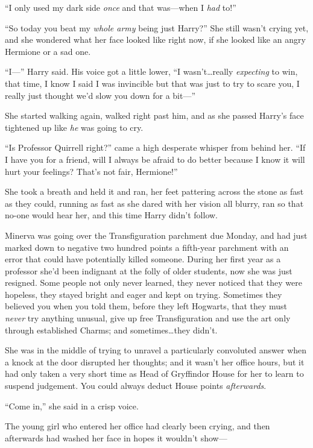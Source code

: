 “I only used my dark side \emph{once} and that was—when I \emph{had} to!”

“So today you beat my \emph{whole army} being just Harry?” She still wasn’t crying yet, and she wondered what her face looked like right now, if she looked like an angry Hermione or a sad one.

“I—” Harry said. His voice got a little lower,
“I wasn’t…really \emph{expecting} to win, that time, I know I said I was invincible but that was just to try to scare you, I really just thought we’d slow you down for a bit—”

She started walking again, walked right past him, and as she passed Harry’s face tightened up like \emph{he} was going to cry.

“Is Professor Quirrell right?” came a high desperate whisper from behind her.
“If I have you for a friend, will I always be afraid to do better because I know it will hurt your feelings? That’s not fair, Hermione!”

She took a breath and held it and ran, her feet pattering across the stone as fast as they could, running as fast as she dared with her vision all blurry, ran so that no-one would hear her, and this time Harry didn’t follow.

\later

Minerva was going over the Transfiguration parchment due Monday, and had just marked down to negative two hundred points a fifth-year parchment with an error that could have potentially killed someone. During her first year as a professor she’d been indignant at the folly of older students, now she was just resigned. Some people not only never learned, they never noticed that they were hopeless, they stayed bright and eager and kept on trying. Sometimes they believed you when you told them, before they left Hogwarts, that they must \emph{never} try anything unusual, give up free Transfiguration and use the art only through established Charms; and sometimes…they didn’t.

She was in the middle of trying to unravel a particularly convoluted answer when a knock at the door disrupted her thoughts; and it wasn’t her office hours, but it had only taken a very short time as Head of Gryffindor House for her to learn to suspend judgement. You could always deduct House points \emph{afterwards}.

“Come in,” she said in a crisp voice.

The young girl who entered her office had clearly been crying, and then afterwards had washed her face in hopes it wouldn’t show—

